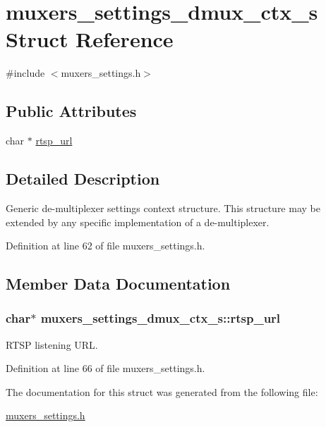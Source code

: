 \hypertarget{structmuxers__settings__dmux__ctx__s}{}\section{muxers\+\_\+settings\+\_\+dmux\+\_\+ctx\+\_\+s Struct Reference}
\label{structmuxers__settings__dmux__ctx__s}


{\ttfamily \#include $<$muxers\+\_\+settings.\+h$>$}

\subsection*{Public Attributes}
\begin{DoxyCompactItemize}
\item 
char $\ast$ \hyperlink{structmuxers__settings__dmux__ctx__s_af025277b858b8947a7fda868e5a19c81}{rtsp\+\_\+url}
\end{DoxyCompactItemize}


\subsection{Detailed Description}
Generic de-\/multiplexer settings context structure. This structure may be extended by any specific implementation of a de-\/multiplexer. 

Definition at line 62 of file muxers\+\_\+settings.\+h.



\subsection{Member Data Documentation}
\subsubsection[{\texorpdfstring{rtsp\+\_\+url}{rtsp_url}}]{\setlength{\rightskip}{0pt plus 5cm}char$\ast$ muxers\+\_\+settings\+\_\+dmux\+\_\+ctx\+\_\+s\+::rtsp\+\_\+url}\hypertarget{structmuxers__settings__dmux__ctx__s_af025277b858b8947a7fda868e5a19c81}{}\label{structmuxers__settings__dmux__ctx__s_af025277b858b8947a7fda868e5a19c81}
R\+T\+SP listening U\+RL. 

Definition at line 66 of file muxers\+\_\+settings.\+h.



The documentation for this struct was generated from the following file\+:\begin{DoxyCompactItemize}
\item 
\hyperlink{muxers__settings_8h}{muxers\+\_\+settings.\+h}\end{DoxyCompactItemize}
